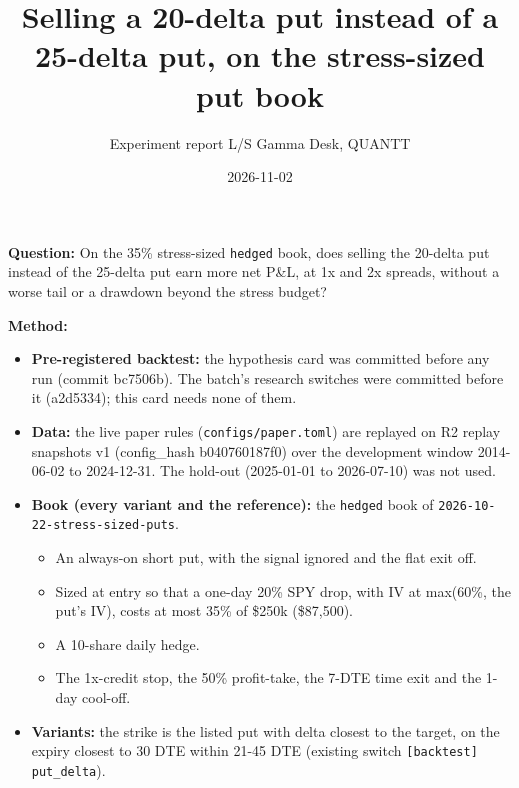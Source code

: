 \documentclass{article}
\title{Selling a 20-delta put instead of a 25-delta put, on the stress-sized put book}
\author{Experiment report \textperiodcentered{} L/S Gamma Desk, QUANTT}
\date{2026-11-02}
\begin{document}
\maketitle

\textbf{Question:} On the 35\% stress-sized \texttt{hedged} book, does selling the 20-delta put instead of the 25-delta put earn more net P\&L, at 1x and 2x spreads, without a worse tail or a drawdown beyond the stress budget?

\textbf{Method:}

\begin{itemize}

\item \textbf{Pre-registered backtest:} the hypothesis card was committed before any run (commit bc7506b). The batch's research switches were committed before it (a2d5334); this card needs none of them.

\item \textbf{Data:} the live paper rules (\texttt{configs/\allowbreak{}paper.\allowbreak{}toml}) are replayed on R2 replay snapshots v1 (config\_hash b040760187f0) over the development window 2014-06-02 to 2024-12-31. The hold-out (2025-01-01 to 2026-07-10) was not used.

\item \textbf{Book (every variant and the reference):} the \texttt{hedged} book of \texttt{2026-\allowbreak{}10-\allowbreak{}22-\allowbreak{}stress-\allowbreak{}sized-\allowbreak{}puts}.

\begin{itemize}

\item An always-on short put, with the signal ignored and the flat exit off.

\item Sized at entry so that a one-day 20\% SPY drop, with IV at max(60\%, the put's IV), costs at most 35\% of \$250k (\$87,500).

\item A 10-share daily hedge.

\item The 1x-credit stop, the 50\% profit-take, the 7-DTE time exit and the 1-day cool-off.

\end{itemize}

\item \textbf{Variants:} the strike is the listed put with delta closest to the target, on the expiry closest to 30 DTE within 21-45 DTE (existing switch \texttt{[backtest] put\_\allowbreak{}delta}).


\end{itemize}
\end{document}
